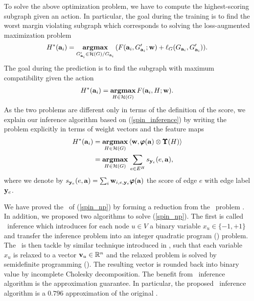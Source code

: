 {%
To solve the above optimization problem, we have to compute the highest-scoring subgraph given an action. 
In particular, the goal during the training is to find the worst margin violating subgraph which corresponds to solving the loss-augmented maximization problem
\begin{align*}
	H^*(\mathbf {a}_i) = \underset{G_{\mathbf {a}_i}'\in\mathcal{H}(G)/G_{\mathbf {a}_i}}{\textbf{argmax}}\, (F(\mathbf {a}_i,G_{\mathbf {a}_i}';\mathbf {w})+\mathbf {\ell}_{G}(G_{\mathbf {a}_i},G_{\mathbf {a}_i}')).
\end{align*}
The goal during the prediction is to find the subgraph with maximum compatibility given the action
\begin{align}
	H^*(\mathbf {a}_i) = \underset{H\in\mathcal{H}(G)}{\textbf{argmax}}\, F(\mathbf {a}_i,H;\mathbf {w}) \label{spin_inference}.
\end{align}
As the two problems are different only in terms of the definition of the score, we explain our inference algorithm based on (\ref{spin_inference}) by writing the problem explicitly in terms of weight vectors and the feature maps
\begin{align}
	H^*(\mathbf {a}_i) &= \underset{H\in\mathcal{H}(G)}{\textbf{argmax}}\, \langle \mathbf {w}, \pmb \varphi(\mathbf {a})\otimes\pmb \Upsilon(H) \rangle \nonumber \\
	&= \underset{H\in\mathcal{H}(G)}{\textbf{argmax}}\, \sum_{e\in E^H}s_{\mathbf {y}_e}(e,\mathbf {a}), \label{spin_np}
\end{align}
where we denote by $s_{\mathbf {y}_e}(e,\mathbf {a}) = \sum_{i}\mathbf {w}_{i,e,\mathbf {y}_e}\pmb \varphi(\mathbf {a})$ the score of edge $e$ with edge label $\mathbf {y}_e$.

We have proved the \nphardness\ of (\ref{spin_np}) by forming a reduction from the \maxcut\ problem \citep{Garey90computers}.
In addition, we proposed two algorithms to solve (\ref{spin_np}).
The first is called {\sdp\ inference} which introduces for each node $u\in V$ a binary variable $x_u\in\{-1,+1\}$ and transfer the inference problem into an integer quadratic program (\iqp) problem.
The \iqp\ is then tackle by similar technique introduced in \citep{Geomans1995improved}, such that each variable $x_u$ is relaxed to a vector $\mathbf {v}_u\in\mathbb{R}^n$ and the relaxed problem is solved by semidefinite programming (\sdp). 
The resulting vector is rounded back into binary value by incomplete Cholesky decomposition.
The benefit from \sdp\ inference algorithm is the approximation guarantee. 
In particular, the proposed \sdp\ inference algorithm is a $0.796$ approximation of the original \iqp.

}
